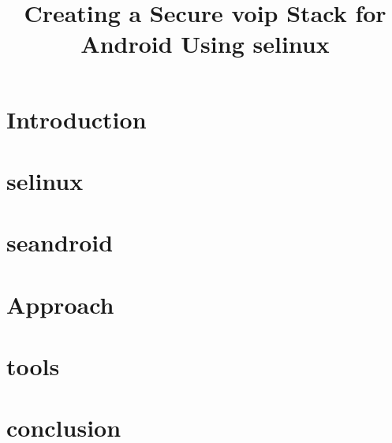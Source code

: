 \documentclass[12pt,conference]{IEEEtran}
\title{Creating a Secure \acs{voip} Stack for Android Using \acs{selinux}}
\author{\IEEEauthorblockN{Fotios Lindiakos}
  \IEEEauthorblockA{flindiak@gmu.edu}
  \and
  \IEEEauthorblockN{Burns Mijanovich}
  \IEEEauthorblockA{bmijanov@gmu.edu}
}
\begin{document}
\maketitle

\section{Introduction}


\section{\acs{selinux}}


\section{\acs{seandroid}}


\section{Approach}


\section{tools}


\section{conclusion}




\end{document}
